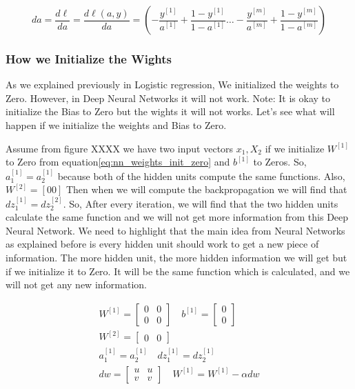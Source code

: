  \begin{equation}\label{eq:logistic_regression_derivatives_da_vectorize}
      da =  \frac{d\ell}{da} = \frac{d\ell(a,y)}{da} = (- \frac{y^{[1]}}{a^{[1]}} + \frac{1-y^{[1]}}{1-a^{[1]}} \ldots - \frac{y^{[m]}}{a^{[m]}} + \frac{1-y^{[m]}}{1-a^{[m]}} )
  \end{equation}
   

\subsubsection{How we Initialize the Wights}

    As we explained previously in Logistic regression, We initialized the weights to Zero. However, in Deep Neural Networks it will not work. Note: It is okay to initialize the Bias to Zero but the wights it will not works. Let's see what will happen if we initialize the weights and Bias to Zero.
 
  Assume from figure XXXX we have two input vectors $x_1,X_2$ if we initialize $W^{[1]}$ to Zero from equation\eqref{eq:nn_weights_init_zero} and $b^{[1]}$ to Zeros. So, $a_1^{[1]}=a_2^{[1]}$ because both of the hidden units compute the same functions. Also, $W^{[2]}=[0 0]$ Then when we will compute the backpropagation we will find that $dz_1^{[1]}=dz_2^{[2]}$. So, After every iteration, we will find that the two hidden units calculate the same function and we will not get more information from this Deep Neural Network. We need to highlight that the main idea from Neural Networks as explained before is every hidden unit should work to get a new piece of information. The more hidden unit, the more hidden information we will get but if we initialize it to Zero. It will be the same function which is calculated, and we will not get any new information.

\begin{subequations}\label{eq:nn_weights_init_zero}
\begin{align}
  W^{[1]} = \begin{bmatrix} 0 & 0\\ 0 & 0 \end{bmatrix} \quad b^{[1]} = \begin{bmatrix} 0 \\ 0 \end{bmatrix} \\
  W^{[2]} = \begin{bmatrix} 0 & 0 \end{bmatrix} \\
  a_1^{[1]} = a_2^{[1]} \quad     dz_1^{[1]} = dz_2^{[1]}\\
  dw = \begin{bmatrix} u & u \\ v & v \end{bmatrix} \quad W^{[1]} = W^{[1]} - \alpha dw
\end{align}
\end{subequations}
     
